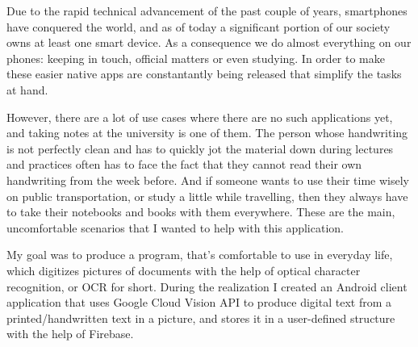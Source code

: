 Due to the rapid technical advancement of the past couple of years, smartphones have conquered the world, and as of today a significant portion of our society owns at least one smart device. As a consequence we do almost everything on our phones: keeping in touch, official matters or even studying. In order to make these easier native apps are constantantly being released that simplify the tasks at hand. 

However, there are a lot of use cases where there are no such applications yet, and taking notes at the university is one of them. The person whose handwriting is not perfectly clean and has to quickly jot the material down during lectures and practices often has to face the fact that they cannot read their own handwriting from the week before. And if someone wants to use their time wisely on public transportation, or study a little while travelling, then they always have to take their notebooks and books with them everywhere. These are the main, uncomfortable scenarios that I wanted to help with this application.

My goal was to produce a program, that's comfortable to use in everyday life, which digitizes pictures of documents with the help of optical character recognition, or OCR for short. During the realization I created an Android client application that uses Google Cloud Vision API to produce digital text from a printed/handwritten text in a picture, and stores it in a user-defined structure with the help of Firebase.


\vfill
\selectthesislanguage

\setcounter{romanPage}{\value{page}}
